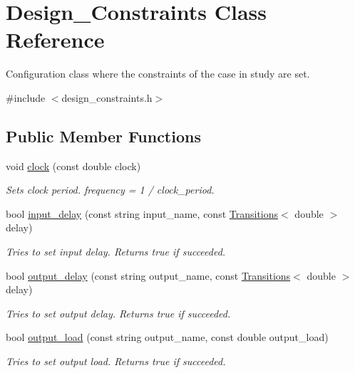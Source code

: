 \hypertarget{classDesign__Constraints}{\section{Design\-\_\-\-Constraints Class Reference}
\label{classDesign__Constraints}
}


Configuration class where the constraints of the case in study are set.  




{\ttfamily \#include $<$design\-\_\-constraints.\-h$>$}

\subsection*{Public Member Functions}
\begin{DoxyCompactItemize}
\item 
void \hyperlink{classDesign__Constraints_a3d8381f421422cdaa12e78216a3b46a8}{clock} (const double clock)
\begin{DoxyCompactList}\small\item\em Sets clock period. frequency = 1 / clock\-\_\-period. \end{DoxyCompactList}\item 
bool \hyperlink{classDesign__Constraints_ab9e466f0f2ad7cfd16f8fe0d0b814b16}{input\-\_\-delay} (const string input\-\_\-name, const \hyperlink{classTransitions}{Transitions}$<$ double $>$ delay)
\begin{DoxyCompactList}\small\item\em Tries to set input delay. Returns true if succeeded. \end{DoxyCompactList}\item 
bool \hyperlink{classDesign__Constraints_a295b66d558e3aefea0b2d2629752517d}{output\-\_\-delay} (const string output\-\_\-name, const \hyperlink{classTransitions}{Transitions}$<$ double $>$ delay)
\begin{DoxyCompactList}\small\item\em Tries to set output delay. Returns true if succeeded. \end{DoxyCompactList}\item 
bool \hyperlink{classDesign__Constraints_a3a670a53112e18db745a6f3de9597cd3}{output\-\_\-load} (const string output\-\_\-name, const double output\-\_\-load)
\begin{DoxyCompactList}\small\item\em Tries to set output load. Returns true if succeeded. \end{DoxyCompactList}\item 

\end{DoxyCompactItemize}
